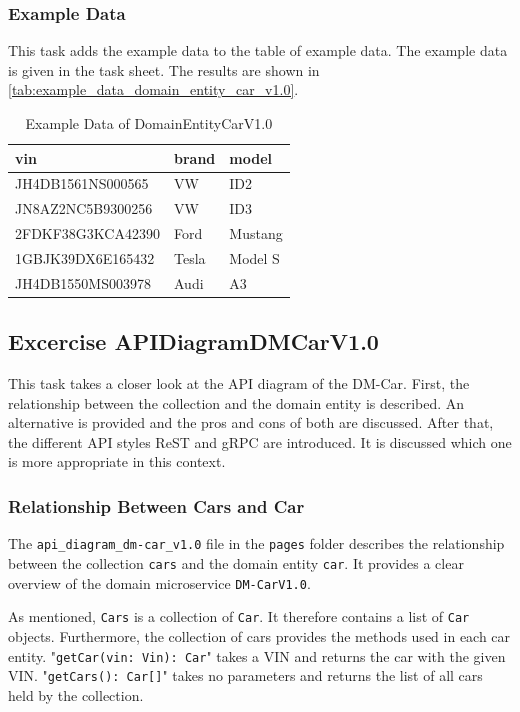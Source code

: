 \subsubsection*{Example Data}
This task adds the example data to the table of example data.
The example data is given in the task sheet.
The results are shown in \autoref{tab:example_data_domain_entity_car_v1.0}.
\begin{table}
    \centering
    \caption{Example Data of DomainEntityCarV1.0}
    \label{tab:example_data_domain_entity_car_v1.0}
    \begin{tabular}{|p{5cm}|p{2cm}|p{2cm}|}
        \hline
        vin & brand & model \\
        \hline
        JH4DB1561NS000565 & VW & ID2 \\
        JN8AZ2NC5B9300256 & VW & ID3 \\
        2FDKF38G3KCA42390 & Ford & Mustang \\
        1GBJK39DX6E165432 & Tesla & Model S \\
        JH4DB1550MS003978 & Audi & A3 \\
        \hline
    \end{tabular}
\end{table}

\subsection{Excercise APIDiagramDMCarV1.0}
\label{subsec:api_diagram_dm_car_v1.0}
This task takes a closer look at the API diagram of the DM-Car.
First, the relationship between the collection and the domain entity is described.
An alternative is provided and the pros and cons of both are discussed.
After that, the different API styles ReST and gRPC are introduced.
It is discussed which one is more appropriate in this context.
\subsubsection*{Relationship Between Cars and Car}
The \texttt{api\_diagram\_dm-car\_v1.0} file in the \texttt{pages} folder describes the relationship between the collection \texttt{cars} and the domain entity \texttt{car}.
It provides a clear overview of the domain microservice \texttt{DM-CarV1.0}.

As mentioned, \texttt{Cars} is a collection of \texttt{Car}.
It therefore contains a list of \texttt{Car} objects.
Furthermore, the collection of cars provides the methods used in each car entity.
"\texttt{getCar(vin: Vin): Car}" takes a VIN and returns the car with the given VIN.
"\texttt{getCars(): Car[]}" takes no parameters and returns the list of all cars held by the collection.

